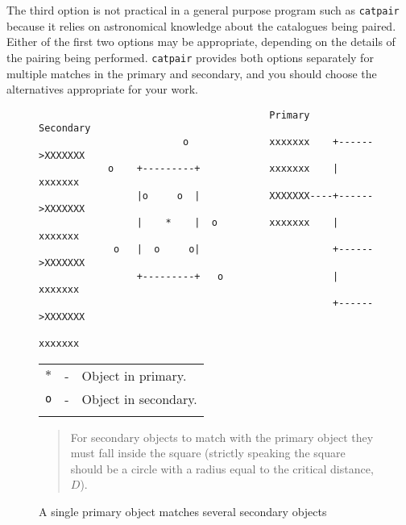 \documentclass[twoside,11pt]{article}
\renewcommand{\_}{\texttt{\symbol{95}}}
\begin{document}
The third option is not practical in a general purpose program such as
{\tt catpair} because it relies on astronomical knowledge about the 
catalogues being paired. Either of the first two options may be 
appropriate, depending on the details of the pairing being performed.
{\tt catpair} provides both options separately for multiple matches in
the primary and secondary, and you should choose the alternatives
appropriate for your work.

\begin{figure}[htbp]

\begin{verbatim}
                                        Primary           Secondary
                         o              xxxxxxx    +------>XXXXXXX
            o    +---------+            xxxxxxx    |       xxxxxxx
                 |o     o  |            XXXXXXX----+------>XXXXXXX
                 |    *    |  o         xxxxxxx    |       xxxxxxx
             o   |  o     o|                       +------>XXXXXXX
                 +---------+   o                   |       xxxxxxx
                                                   +------>XXXXXXX
                                                           xxxxxxx
\end{verbatim}

\begin{center}
\begin{tabular}{lll}
{$\ast$} & -  & Object in primary.   \\
{\tt o}  & -  & Object in secondary. \\
    &  &  \\
\end{tabular}

\begin{quote}
For secondary objects to match with the primary object they must fall
inside the square (strictly speaking the square should be a circle with
a radius equal to the critical distance, $D$).
\end{quote}
\end{center}

\caption{A single primary object matches several secondary objects
\label{PAIR_PRIM_MULT} }

\end{figure}
\end{document}
